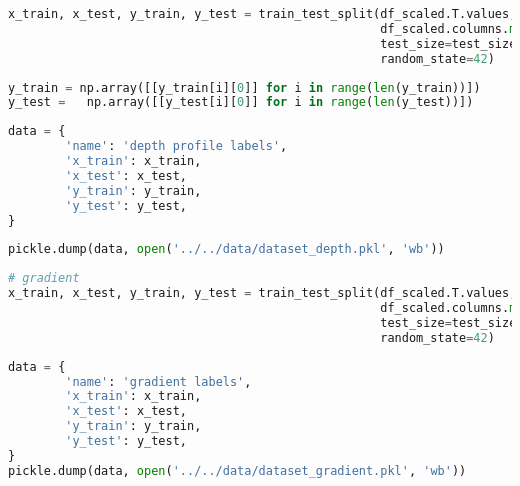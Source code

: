 \begin{lstlisting}[language=Python]
x_train, x_test, y_train, y_test = train_test_split(df_scaled.T.values,
                                                    df_scaled.columns.map(lambda x: transform_depth_label(x)).to_numpy(), # first part of the filename is the top label
                                                    test_size=test_size_ratio,
                                                    random_state=42)
\end{lstlisting}

\begin{lstlisting}[language=Python]
y_train = np.array([[y_train[i][0]] for i in range(len(y_train))])
y_test =   np.array([[y_test[i][0]] for i in range(len(y_test))])
\end{lstlisting}

\begin{lstlisting}[language=Python]
data = {
        'name': 'depth profile labels',
        'x_train': x_train,
        'x_test': x_test,
        'y_train': y_train,
        'y_test': y_test,
}
\end{lstlisting}

\begin{lstlisting}[language=Python]
pickle.dump(data, open('../../data/dataset_depth.pkl', 'wb'))
\end{lstlisting}

\begin{lstlisting}[language=Python]
# gradient
x_train, x_test, y_train, y_test = train_test_split(df_scaled.T.values,
                                                    df_scaled.columns.map(lambda x: int('etching' in x)), # first part of the filename is the top label
                                                    test_size=test_size_ratio,
                                                    random_state=42)
\end{lstlisting}

\begin{lstlisting}[language=Python]
data = {
        'name': 'gradient labels',
        'x_train': x_train,
        'x_test': x_test,
        'y_train': y_train,
        'y_test': y_test,
}
pickle.dump(data, open('../../data/dataset_gradient.pkl', 'wb'))
\end{lstlisting}
